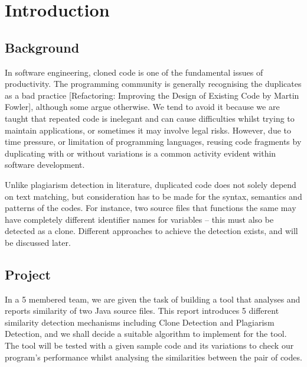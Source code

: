 
\section{Introduction}
\subsection{Background}
In software engineering, cloned code is one of the fundamental issues of productivity. The programming community is generally recognising the duplicates as a bad practice [Refactoring: Improving the Design of Existing Code by Martin Fowler], although some argue otherwise. We tend to avoid it because we are taught that repeated code is inelegant and can cause difficulties whilst trying to maintain applications, or sometimes it may involve legal risks. However, due to time pressure, or limitation of programming languages, reusing code fragments by duplicating with or without variations is a common activity evident within software development.

Unlike plagiarism detection in literature, duplicated code does not solely depend on text matching, but consideration has to be made for the syntax, semantics and patterns of the codes. For instance, two source files that functions the same may have completely different identifier names for variables – this must also be detected as a clone. Different approaches to achieve the detection exists, and will be discussed later.
\subsection{Project}
In a 5 membered team, we are given the task of building a tool that analyses and reports similarity of two Java source files. This report introduces 5 different similarity detection mechanisms including Clone Detection and Plagiarism Detection, and we shall decide a suitable algorithm to implement for the tool. The tool will be tested with a given sample code and its variations to check our program’s performance whilst analysing the similarities between the pair of codes.

\break
